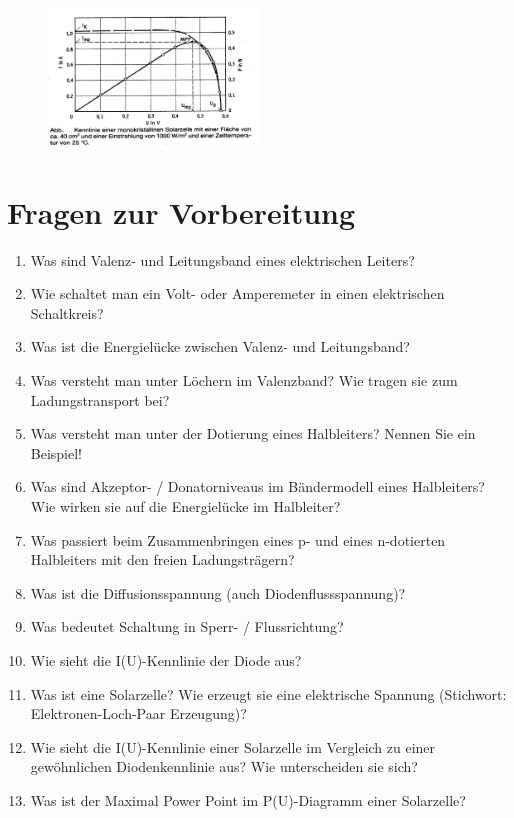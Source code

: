 \begin{figure}[h]
	\centering
		\includegraphics[width=0.5\textwidth]{Abbildungen/Leistung.jpg}
	\label{fig:Leistung}
\end{figure}

\section{Fragen zur Vorbereitung}

\begin{enumerate}
	\item Was sind Valenz- und Leitungsband eines elektrischen Leiters?
	\item Wie schaltet man ein Volt- oder Amperemeter in einen elektrischen Schaltkreis?
	\item Was ist die Energielücke zwischen Valenz- und Leitungsband?
	\item Was versteht man unter Löchern im Valenzband? Wie tragen sie zum Ladungstransport bei?
	\item Was versteht man unter der Dotierung eines Halbleiters? Nennen Sie ein Beispiel!
	\item Was sind Akzeptor- / Donatorniveaus im Bändermodell eines Halbleiters? Wie wirken sie auf die Energielücke im Halbleiter?
	\item Was passiert beim Zusammenbringen eines p- und eines n-dotierten Halbleiters mit den freien Ladungsträgern?
	\item Was ist die Diffusionsspannung (auch Diodenflussspannung)?
	\item Was bedeutet Schaltung in Sperr- / Flussrichtung?
	\item Wie sieht die I(U)-Kennlinie der Diode aus? %
	\item Was ist eine Solarzelle? Wie erzeugt sie eine elektrische Spannung (Stichwort: Elektronen-Loch-Paar Erzeugung)?
	\item Wie sieht die I(U)-Kennlinie einer Solarzelle im Vergleich zu einer gewöhnlichen Diodenkennlinie aus? Wie unterscheiden sie sich?
	\item Was ist der Maximal Power Point im P(U)-Diagramm einer Solarzelle?
\end{enumerate}

